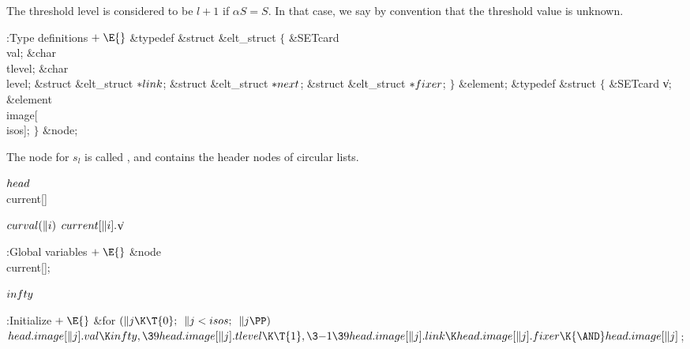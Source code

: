 The threshold level is considered to be $l+1$ if $\alpha S=S$. In that
case, we say by convention that the threshold value is unknown.

\Y\B\4:Type definitions\X${}\mathrel+\E{}$\6
\&{typedef} \&{struct} \&{elt\_struct} ${}\{{}$\1\6
\&{SETcard} \\{val};\6
\&{char} \\{tlevel};\6
\&{char} \\{level};\6
\&{struct} \&{elt\_struct} ${}{*}\\{link}{}$;%
\6
\&{struct} \&{elt\_struct} ${}{*}\\{next}{}$;\6
\&{struct} \&{elt\_struct} ${}{*}\\{fixer}{}$;\2\6
${}\}{}$ \&{element};\7
\&{typedef} \&{struct} ${}\{{}$\1\6
\&{SETcard} \|v;\6
\&{element} \\{image}[\\{isos}];\2\6
${}\}{}$ \&{node};\par
\fi

The node for $s_l$ is called , and  contains
the header nodes of circular lists.

\Y\B\4\D$\\{head}$ \5
\\{current}[]\par
\B\4\D$\\{curval}(\|i)$ \5
$\\{current}[\|i].{}$\|v\par
\Y\B\4:Global variables\X${}\mathrel+\E{}$\6
\&{node} \\{current}[];\par
\fi

\B\D$\\{infty}$ \5
\par
\Y\B\4:Initialize\X${}\mathrel+\E{}$\6
\&{for} ${}(\|j\K\T{0};{}$ ${}\|j<\\{isos};{}$ ${}\|j\PP){}$\1\5
${}\\{head}.\\{image}[\|j].\\{val}\K\\{infty},\39\\{head}.\\{image}[\|j].%
\\{tlevel}\K\T{1},\3{-1}\39\\{head}.\\{image}[\|j].\\{link}\K\\{head}.%
\\{image}[\|j].\\{fixer}\K{\AND}\\{head}.\\{image}[\|j]{}$;\2\par
\fi

